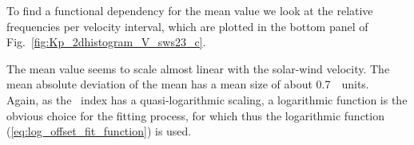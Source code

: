 To find a functional dependency for the mean \Kp{} value we look at the relative frequencies per velocity interval, which are plotted in the bottom panel of Fig.~\ref{fig:Kp_2dhistogram_V_sws23_c}.
\begin{figure}
\end{figure}
The mean \Kp{} value seems to scale almost linear with the solar-wind velocity. The mean absolute deviation of the mean has a mean size of about \SI{0.7}{\Kp~units}.\\

Again, as the \Kp~index has a quasi-logarithmic scaling, a logarithmic function is the obvious choice for the fitting process, for which thus the logarithmic function (\ref{eq:log_offset_fit_function}) is used.\\

